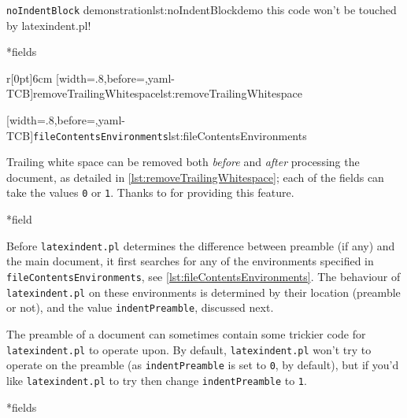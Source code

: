 \begin{cmhlistings}[style=demo,escapeinside={(*@}{@*)}]{\texttt{noIndentBlock} demonstration}{lst:noIndentBlockdemo}
        this code
                won't
     be touched
                    by
             latexindent.pl!
	\end{cmhlistings}

*{fields}

\begin{wrapfigure}[12]{r}[0pt]{6cm}
[width=.8\linewidth,before=\centering,yaml-TCB]{removeTrailingWhitespace}{lst:removeTrailingWhitespace}

\vspace{.2cm}
[width=.8\linewidth,before=\centering,yaml-TCB]{\texttt{fileContentsEnvironments}}{lst:fileContentsEnvironments}
\end{wrapfigure}
Trailing white space can be removed both \emph{before} and \emph{after} processing 
the document, as detailed in \cref{lst:removeTrailingWhitespace}; each of the fields 
can take the values \texttt{0} or \texttt{1}.
Thanks to \cite{vosskuhle} for providing this feature.

*{field}

Before \texttt{latexindent.pl} determines the difference between preamble (if any) and the main document,
it first searches for any of the environments specified in \texttt{fileContentsEnvironments}, see
\cref{lst:fileContentsEnvironments}.
  The behaviour of \texttt{latexindent.pl} on these environments is determined by their location (preamble or not), and 
  the value \texttt{indentPreamble}, discussed next.


The preamble of a document can sometimes contain some trickier code
for \texttt{latexindent.pl} to operate upon. By default, \texttt{latexindent.pl}
won't try to operate on the preamble (as \texttt{indentPreamble} is set to \texttt{0},
by default), but if you'd like \texttt{latexindent.pl} to try then change \texttt{indentPreamble} to \texttt{1}.

*{fields}

